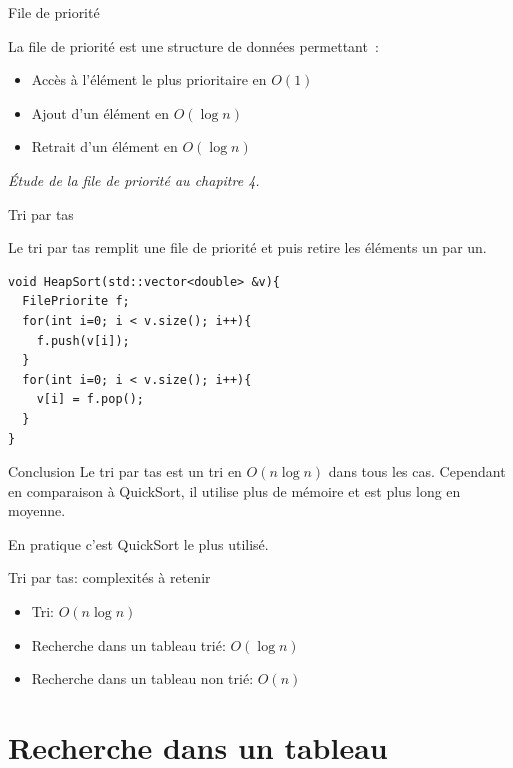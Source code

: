 \begin{frame}{File de priorité}

La file de priorité est une structure de données permettant~:
\begin{itemize}
\item Accès à l'élément le plus prioritaire en $O(1)$
\item Ajout d'un élément en $O(\log n)$
\item Retrait d'un élément en $O(\log n)$
\end{itemize}

\vspace{1cm}
\textit{Étude de la file de priorité au chapitre 4.}
\end{frame}

\begin{frame}[fragile]{Tri par tas}

Le tri par tas remplit une file de priorité et puis retire les éléments un par un.
\begin{verbatim}
void HeapSort(std::vector<double> &v){
  FilePriorite f;
  for(int i=0; i < v.size(); i++){
    f.push(v[i]);
  }
  for(int i=0; i < v.size(); i++){
    v[i] = f.pop();
  }
}
\end{verbatim}
\end{frame}

\begin{frame}{Conclusion}
Le tri par tas est un tri en $O(n \log n)$ dans tous les cas. Cependant en comparaison à QuickSort, il utilise plus de mémoire et est plus long en moyenne.

En pratique c'est QuickSort le plus utilisé.
\end{frame}


\begin{frame}{Tri par tas: complexités à retenir}

\begin{itemize}
\item Tri: $O(n \log n)$
\item Recherche dans un tableau trié: $O(\log n)$
\item Recherche dans un tableau non trié: $O(n)$
\end{itemize}

\end{frame}

\section{Recherche dans un tableau}

